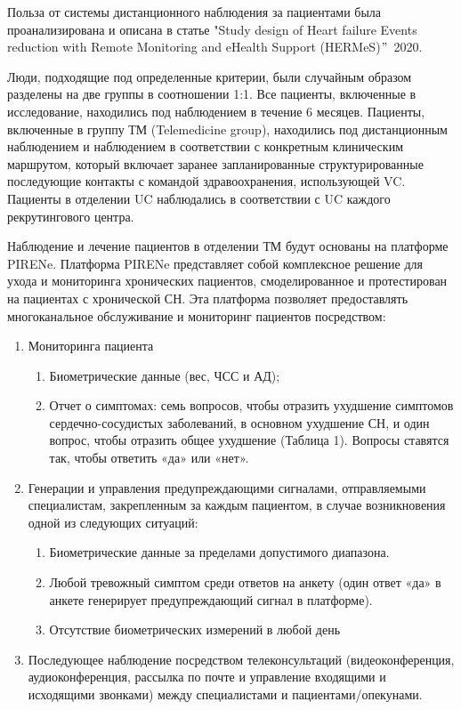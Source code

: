 \documentclass[a4paper,12pt]{article}
\begin{document}
	Польза от системы дистанционного наблюдения за пациентами была проанализирована и описана в статье "Study design of Heart failure Events reduction with Remote Monitoring and eHealth Support (HERMeS)\("\)\, 2020. \par
	Люди, подходящие под определенные критерии, были случайным образом разделены на две группы в соотношении 1:1.
	Все пациенты, включенные в исследование, находились под наблюдением в течение 6 месяцев.
	Пациенты, включенные в группу ТМ (Telemedicine group), находились под дистанционным наблюдением и наблюдением в соответствии с конкретным клиническим маршрутом, который включает заранее запланированные структурированные последующие контакты с командой здравоохранения, использующей VC. Пациенты в отделении UC наблюдались в соответствии с UC каждого рекрутингового центра. \par
	Наблюдение и лечение пациентов в отделении ТМ будут основаны на платформе PIRENe. Платформа PIRENe представляет собой комплексное решение для ухода и мониторинга хронических пациентов, смоделированное и протестирован на пациентах с хронической СН.
	Эта платформа позволяет предоставлять многоканальное обслуживание и мониторинг пациентов посредством: \par
	\begin{enumerate}
		\item Мониторинга пациента
		\begin{enumerate}
			\item Биометрические данные (вес, ЧСС и АД);
			\item Отчет о симптомах: семь вопросов, чтобы отразить ухудшение симптомов сердечно-сосудистых заболеваний, в основном ухудшение СН, и один вопрос, чтобы отразить общее ухудшение (Таблица 1).
			Вопросы ставятся так, чтобы ответить «да» или «нет».
		\end{enumerate}
		\item Генерации и управления предупреждающими сигналами, отправляемыми специалистам, закрепленным за каждым пациентом, в случае возникновения одной из следующих ситуаций:
		\begin{enumerate}
			\item Биометрические данные за пределами допустимого диапазона.
			\item Любой тревожный симптом среди ответов на анкету (один ответ «да» в анкете генерирует предупреждающий сигнал в платформе).
			\item Отсутствие биометрических измерений в любой день
		\end{enumerate}
		\item Последующее наблюдение посредством телеконсультаций (видеоконференция, аудиоконференция, рассылка по почте и управление входящими и исходящими звонками) между специалистами и пациентами/опекунами.
	\end{enumerate}
\end{document}
